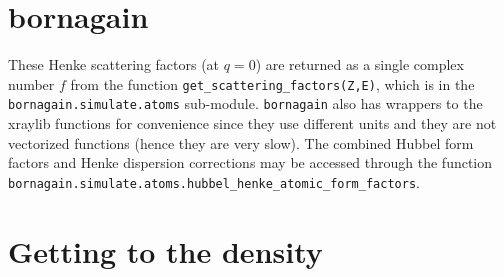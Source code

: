 \documentclass[11pt]{article}
\begin{document}
\section{bornagain}

These Henke scattering factors (at $q=0$) are returned as a single complex number $f$ from the function \texttt{get\_scattering\_factors(Z,E)}, which is in the \texttt{bornagain.simulate.atoms} sub-module.  \texttt{bornagain} also has wrappers to the xraylib functions for convenience since they use different units and they are not vectorized functions (hence they are very slow).  The combined Hubbel form factors and Henke dispersion corrections may be accessed through the function \texttt{bornagain.simulate.atoms.hubbel\_henke\_atomic\_form\_factors}.




\section{Getting to the density}
\end{document}
